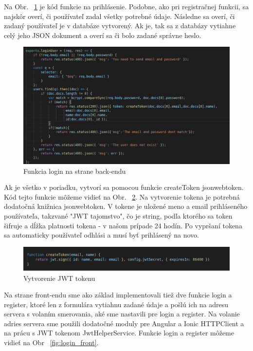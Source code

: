 \indent Na Obr. ~\ref{fig:login_back} je kód funkcie na prihlásenie. Podobne, ako pri registračnej funkcii, sa najskôr overí, či používateľ zadal všetky potrebné údaje. Následne sa overí, či zadaný používateľ je v databáze vytvorený. Ak je, tak sa z databázy vytiahne celý jeho JSON dokument a overí sa či bolo zadané správne heslo.

\begin{figure}[H]
    \centering
    \includegraphics[scale=0.40]{img/imp/login_back.png}
    \caption{Funkcia login na strane back-endu}
    \label{fig:login_back}
\end{figure}

\indent Ak je všetko v poriadku, vytvorí sa pomocou funkcie createToken jsonwebtoken. Kód tejto funkcie môžeme vidieť na Obr. ~\ref{fig:jwt}. Na vytvorenie tokena je potrebná dodatočná knižnica jsonwebtoken. V tokene je uložené meno a email prihláseného používateľa, takzvané "JWT tajomstvo", čo je string, podľa ktorého sa token šifruje a dĺžka platnosti tokena - v našom prípade 24 hodín. Po vypršaní tokena sa automaticky používateľ odhlási a musí byť prihlásený na novo. 

\begin{figure}[H]
    \centering
    \includegraphics[scale=0.42]{img/imp/jwt.png}
    \caption{Vytvorenie JWT tokenu}
    \label{fig:jwt}
\end{figure}

\indent Na strane front-endu sme ako základ implementovali tiež dve funkcie login a register, ktoré len z formulára vytiahnu zadané údaje a pošlú ich na adresu servera s volaním smerovania, aké sme nastavili pre login a register. Na volanie adries servera sme použili dodatočné moduly pre Angular a Ionic HTTPClient a na prácu s JWT tokenom JwtHelperService. Funkcie login a register môžeme vidieť na Obr ~\ref{fig:login_front}. 

